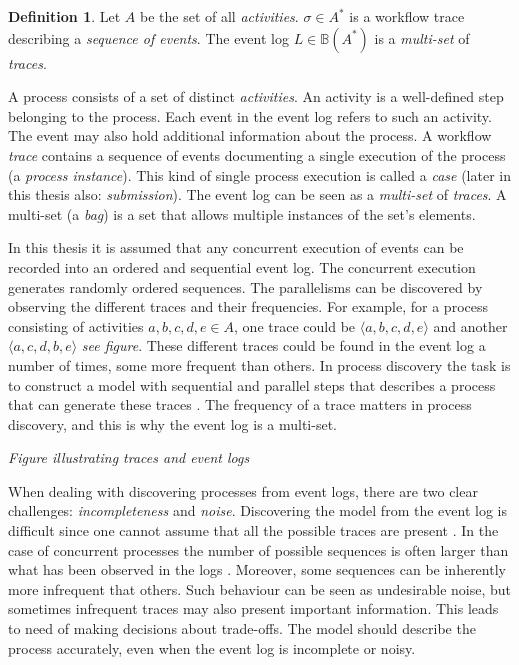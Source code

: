 \documentclass[english,12pt,a4paper,pdftex,sci,utf8]{aaltothesis}
\theoremstyle{definition}
\newtheorem{definition}{Definition}
\newcommand{\nyi}[1]{\noindent\colorbox{nyibg}{\textcolor{nyitext}{\emph{#1}}}}
\begin{document}
\label{sec:eventtheory}

\begin{definition}
Let $A$ be the set of all \emph{activities}. 
$\sigma \in A^*$ is a workflow trace describing a \emph{sequence of events}.
The event log $L \in \mathbb{B}(A^*)$ is a \emph{multi-set} of \emph{traces}.
\end{definition}

A process consists of a set of distinct \emph{activities}.
An activity is a well-defined step belonging to the process.
Each event in the event log refers to such an activity.
The event may also hold additional information about the process.
A workflow \emph{trace} contains a sequence of events documenting a single execution of the process (a \emph{process instance}).
This kind of single process execution is called a \emph{case} (later in this thesis also: \emph{submission}).
The event log can be seen as a \emph{multi-set} of \emph{traces}. 
A multi-set (a \emph{bag}) is a set that allows multiple instances of the set's elements. \cite{van2015extracting}

In this thesis it is assumed that any concurrent execution of events can be recorded into
an ordered and sequential event log. 
The concurrent execution generates randomly ordered sequences.
The parallelisms can be discovered by observing the different traces and their frequencies.
For example, for a process consisting of activities $a,b,c,d,e \in A$, one trace could be 
$\langle a,b,c,d,e \rangle$ and another $\langle a,c,d,b,e \rangle$ \nyi{see figure}.
These different traces could be found in the event log a number of times, some more frequent than others.
In process discovery the task is to construct a model with sequential and parallel steps 
that describes a process that can generate these traces \cite{van2013discovering}.
The frequency of a trace matters in process discovery, and this is why the event log is a multi-set.

\nyi{Figure illustrating traces and event logs}

When dealing with discovering processes from event logs, there are two clear challenges: \emph{incompleteness} and \emph{noise}. 
Discovering the model from the event log is difficult since one cannot assume that all the possible traces are present \cite{van2013discovering}. 
In the case of concurrent processes the number of possible sequences is often larger than what has been observed in the logs \cite{van2007business}.
Moreover, some sequences can be inherently more infrequent that others. 
Such behaviour can be seen as undesirable noise, but sometimes infrequent traces may also present important information.
This leads to need of making decisions about trade-offs. 
The model should describe the process accurately, even when the event log is incomplete or noisy.
\end{document}
